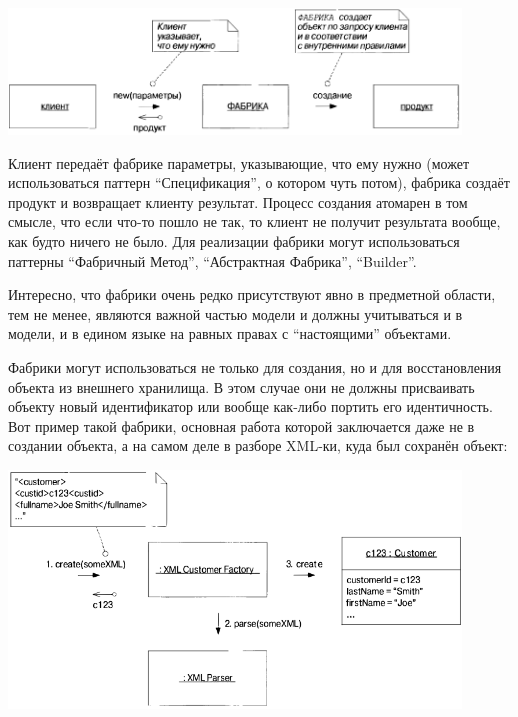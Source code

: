 \documentclass[a5paper]{article}
\begin{document}
\begin{center}
    \includegraphics[width=0.9\textwidth]{factory.png}
\end{center}

Клиент передаёт фабрике параметры, указывающие, что ему нужно (может использоваться паттерн ``Спецификация'', о котором чуть потом), фабрика создаёт продукт и возвращает клиенту результат. Процесс создания атомарен в том смысле, что если что-то пошло не так, то клиент не получит результата вообще, как будто ничего не было. Для реализации фабрики могут использоваться паттерны ``Фабричный Метод'', ``Абстрактная Фабрика'', ``Builder''.

Интересно, что фабрики очень редко присутствуют явно в предметной области, тем не менее, являются важной частью модели и должны учитываться и в модели, и в едином языке на равных правах с ``настоящими'' объектами.

Фабрики могут использоваться не только для создания, но и для восстановления объекта из внешнего хранилища. В этом случае они не должны присваивать объекту новый идентификатор или вообще как-либо портить его идентичность. Вот пример такой фабрики, основная работа которой заключается даже не в создании объекта, а на самом деле в разборе XML-ки, куда был сохранён объект:

\begin{center}
    \includegraphics[width=0.9\textwidth]{xmlFactory.png}
\end{center}
\end{document}
